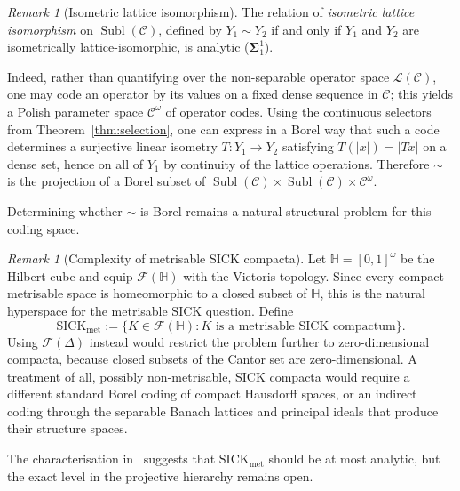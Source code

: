\documentclass[12pt]{amsart}
\theoremstyle{plain}
\theoremstyle{definition}
\theoremstyle{remark}
\newtheorem{remark}[theorem]{Remark}
\DeclareMathOperator{\Subl}{Subl}
\begin{document}
\begin{remark}[Isometric lattice isomorphism]\label{rem:isom-relation}
The relation of \emph{isometric lattice isomorphism} on $\Subl(\mathcal{C})$,
defined by $Y_1 \sim Y_2$ if and only if $Y_1$ and $Y_2$ are isometrically
lattice-isomorphic, is analytic ($\boldsymbol{\Sigma}^1_1$).

Indeed, rather than quantifying over the non-separable operator space
$\mathcal{L}(\mathcal{C})$, one may code an operator by its values on a fixed
dense sequence in $\mathcal{C}$; this yields a Polish parameter space
$\mathcal{C}^\omega$ of operator codes.  Using the continuous selectors from
Theorem~\ref{thm:selection}, one can express in a Borel way that such a code
determines a surjective linear isometry $T \colon Y_1 \to Y_2$ satisfying
$T(\lvert x \rvert) = \lvert T x \rvert$ on a dense set, hence on all of $Y_1$
by continuity of the lattice operations.  Therefore $\sim$ is the projection of
a Borel subset of
$\Subl(\mathcal{C}) \times \Subl(\mathcal{C}) \times \mathcal{C}^\omega$.

Determining whether $\sim$ is Borel remains a natural structural problem for
this coding space.
\end{remark}

\begin{remark}[Complexity of metrisable SICK compacta]\label{rem:SICK-complexity}
Let $\mathbb H=[0,1]^\omega$ be the Hilbert cube and equip
$\mathcal{F}(\mathbb H)$ with the Vietoris topology.  Since every compact
metrisable space is homeomorphic to a closed subset of $\mathbb H$, this is the
natural hyperspace for the metrisable SICK question.  Define
\[
    \mathrm{SICK}_{\mathrm{met}}
    := \bigl\{K \in \mathcal{F}(\mathbb H) \colon K \text{ is a metrisable SICK
    compactum}\bigr\}.
\]
Using $\mathcal{F}(\Delta)$ instead would restrict the problem further to
zero-dimensional compacta, because closed subsets of the Cantor set are
zero-dimensional.  A treatment of all, possibly non-metrisable, SICK compacta
would require a different standard Borel coding of compact Hausdorff spaces, or
an indirect coding through the separable Banach lattices and principal ideals
that produce their structure spaces.

The characterisation in~\cite{AMRT2022Sick} suggests that
$\mathrm{SICK}_{\mathrm{met}}$ should be at most analytic, but the exact level in
the projective hierarchy remains open.
\end{remark}

\end{document}
